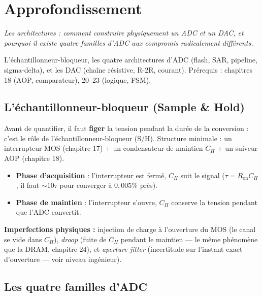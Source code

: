 \documentclass[12pt,a4paper,twoside]{book}
\begin{document}
\section{Approfondissement}

\vspace{0.3cm}
\textit{Les architectures : comment construire physiquement un ADC et un DAC, et pourquoi il existe quatre familles d'ADC aux compromis radicalement différents.}
\vspace{0.3cm}

\begin{approfondissement}
L'échantillonneur-bloqueur, les quatre architectures d'ADC (flash, SAR, pipeline, sigma-delta), et les DAC (chaîne résistive, R-2R, courant). Prérequis : chapitres 18 (AOP, comparateur), 20--23 (logique, FSM).
\end{approfondissement}

\subsection{L'échantillonneur-bloqueur (Sample \& Hold)}

\begin{formule}
Avant de quantifier, il faut \textbf{figer} la tension pendant la durée de la conversion : c'est le rôle de l'échantillonneur-bloqueur (S/H). Structure minimale : un interrupteur MOS (chapitre 17) + un condensateur de maintien $C_H$ + un suiveur AOP (chapitre 18).

\begin{itemize}[nosep]
\item \textbf{Phase d'acquisition} : l'interrupteur est fermé, $C_H$ suit le signal ($\tau = R_{\text{on}} C_H$, il faut $\sim 10\tau$ pour converger à $0{,}005\%$ près).
\item \textbf{Phase de maintien} : l'interrupteur s'ouvre, $C_H$ conserve la tension pendant que l'ADC convertit.
\end{itemize}

\textbf{Imperfections physiques :} injection de charge à l'ouverture du MOS (le canal se vide dans $C_H$), \textit{droop} (fuite de $C_H$ pendant le maintien --- le même phénomène que la DRAM, chapitre 24), et \textit{aperture jitter} (incertitude sur l'instant exact d'ouverture --- voir niveau ingénieur).
\end{formule}

\subsection{Les quatre familles d'ADC}
\end{document}
